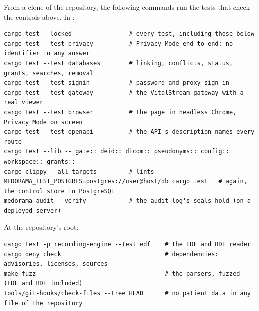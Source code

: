 From a clone of the repository, the following commands run the tests that check the controls
above. In :
\begin{lstlisting}[style=shell]
cargo test --locked                # every test, including those below
cargo test --test privacy          # Privacy Mode end to end: no identifier in any answer
cargo test --test databases        # linking, conflicts, status, grants, searches, removal
cargo test --test signin           # password and proxy sign-in
cargo test --test gateway          # the VitalStream gateway with a real viewer
cargo test --test browser          # the page in headless Chrome, Privacy Mode on screen
cargo test --test openapi          # the API's description names every route
cargo test --lib -- gate:: deid:: dicom:: pseudonyms:: config:: workspace:: grants::
cargo clippy --all-targets         # lints
MEDORAMA_TEST_POSTGRES=postgres://user@host/db cargo test   # again, the control store in PostgreSQL
medorama audit --verify            # the audit log's seals hold (on a deployed server)
\end{lstlisting}
At the repository's root:
\begin{lstlisting}[style=shell]
cargo test -p recording-engine --test edf    # the EDF and BDF reader
cargo deny check                             # dependencies: advisories, licenses, sources
make fuzz                                    # the parsers, fuzzed (EDF and BDF included)
tools/git-hooks/check-files --tree HEAD      # no patient data in any file of the repository
\end{lstlisting}

